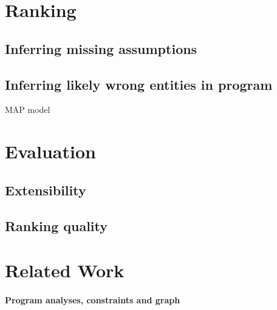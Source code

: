 % 
% 
% 
% 
% 
% 
\section{Ranking}
\label{sec:ranking}

\subsection{Inferring missing assumptions}
\label{sec:assumptions}

\subsection{Inferring likely wrong entities in program}

MAP model

\section{Evaluation}
\label{sec:evaluation}

\subsection{Extensibility}

\subsection{Ranking quality}

\section{Related Work}

\paragraph{Program analyses, constraints and graph} 

